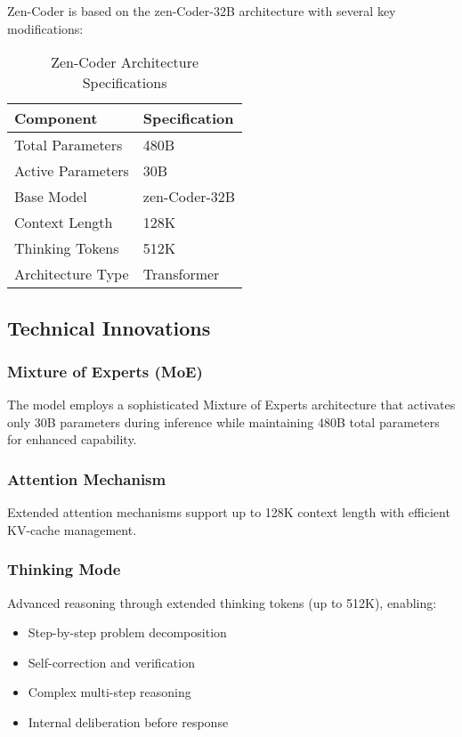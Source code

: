 \documentclass[11pt,a4paper]{article}
\begin{document}
Zen-Coder is based on the zen-Coder-32B architecture with several key modifications:

\begin{table}[H]
\centering
\begin{tabular}{ll}
\toprule
\textbf{Component} & \textbf{Specification} \\
\midrule
Total Parameters & 480B \\
Active Parameters & 30B \\
Base Model & zen-Coder-32B \\
Context Length & 128K \\
Thinking Tokens & 512K \\


Architecture Type & Transformer \\
\bottomrule
\end{tabular}
\caption{Zen-Coder Architecture Specifications}
\end{table}

\subsection{Technical Innovations}

\subsubsection{Mixture of Experts (MoE)}
The model employs a sophisticated Mixture of Experts architecture that activates only 30B parameters 
during inference while maintaining 480B total parameters for enhanced capability.

\subsubsection{Attention Mechanism}
Extended attention mechanisms support up to 128K context length with efficient KV-cache management.

\subsubsection{Thinking Mode}
Advanced reasoning through extended thinking tokens (up to 512K), enabling:
\begin{itemize}
    \item Step-by-step problem decomposition
    \item Self-correction and verification
    \item Complex multi-step reasoning
    \item Internal deliberation before response
\end{itemize}
\end{document}
